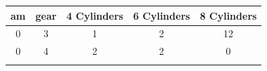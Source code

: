 \documentclass[]{article}
\theoremstyle{definition}
\theoremstyle{definition}
\theoremstyle{definition}
\theoremstyle{remark}
\begin{document}
\begin{longtable}[]{@{}ccccc@{}}
\toprule
\begin{minipage}[b]{0.06\columnwidth}\centering\strut
am\strut
\end{minipage} & \begin{minipage}[b]{0.08\columnwidth}\centering\strut
gear\strut
\end{minipage} & \begin{minipage}[b]{0.17\columnwidth}\centering\strut
4 Cylinders\strut
\end{minipage} & \begin{minipage}[b]{0.17\columnwidth}\centering\strut
6 Cylinders\strut
\end{minipage} & \begin{minipage}[b]{0.17\columnwidth}\centering\strut
8 Cylinders\strut
\end{minipage}\tabularnewline
\midrule
\endhead
\begin{minipage}[t]{0.06\columnwidth}\centering\strut
0\strut
\end{minipage} & \begin{minipage}[t]{0.08\columnwidth}\centering\strut
3\strut
\end{minipage} & \begin{minipage}[t]{0.17\columnwidth}\centering\strut
1\strut
\end{minipage} & \begin{minipage}[t]{0.17\columnwidth}\centering\strut
2\strut
\end{minipage} & \begin{minipage}[t]{0.17\columnwidth}\centering\strut
12\strut
\end{minipage}\tabularnewline
\begin{minipage}[t]{0.06\columnwidth}\centering\strut
0\strut
\end{minipage} & \begin{minipage}[t]{0.08\columnwidth}\centering\strut
4\strut
\end{minipage} & \begin{minipage}[t]{0.17\columnwidth}\centering\strut
2\strut
\end{minipage} & \begin{minipage}[t]{0.17\columnwidth}\centering\strut
2\strut
\end{minipage} & \begin{minipage}[t]{0.17\columnwidth}\centering\strut
0\strut
\end{minipage}\tabularnewline
\begin{minipage}[t]{0.06\columnwidth}\centering\strut

\end{minipage}
\end{longtable}
\end{document}
